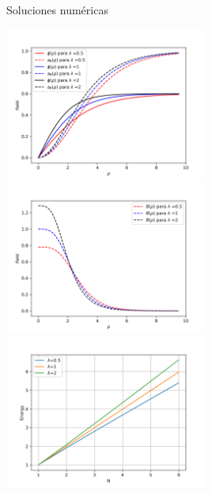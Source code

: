 \documentclass[11pt,t]{beamer}
\begin{document}
\begin{frame}{Soluciones numéricas}

\includegraphics[width=0.5\textwidth]{fields.png}
\includegraphics[width=0.5\textwidth]{Bfield.png}
\includegraphics[width=0.5\textwidth]{Energy.png}
    
\end{frame}





\end{document}
